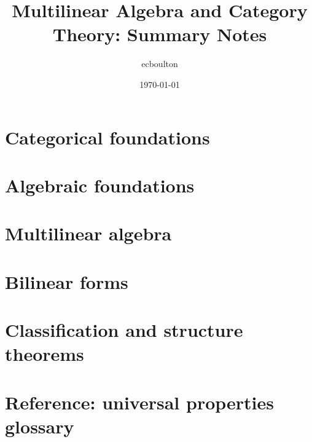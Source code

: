 

\title{\textbf{Multilinear Algebra and Category Theory: Summary Notes}}
\author{ecboulton}
\date{\today}



	
	\maketitle
	\tableofcontents
	\newpage
	
	\section{Categorical foundations}
	
	
	
	\section{Algebraic foundations}

	\section{Multilinear algebra}

	\section{Bilinear forms}

	\section{Classification and structure theorems}

	\section{Reference: universal properties glossary}
	
	
